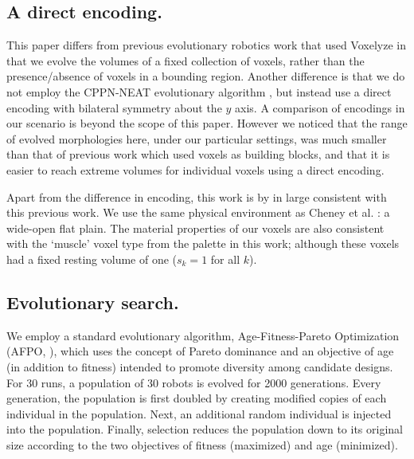 


\subsection{A direct encoding.}


This paper differs from previous evolutionary robotics work that used Voxelyze \cite{Cheney:2013:UEE:2463372.2463404, cheney2014evolved, Cheney:2015:ESR:2739480.2754662} in that we evolve the volumes of a fixed collection of voxels, rather than the presence/absence of voxels in a bounding region. 
Another difference is that 
we do not employ the CPPN-NEAT evolutionary algorithm \cite{Stanley2007}, 
but instead use a direct encoding with bilateral symmetry about the $y$ axis.
A comparison of encodings in our scenario is beyond the scope of this paper.
However we noticed that the range of evolved morphologies here, under our particular settings, was much smaller than that of previous work which used voxels as building blocks,
and that it is easier to reach extreme volumes for individual voxels using a direct encoding. 

Apart from the difference in encoding, this work is by in large consistent with this previous work. We use the same physical environment as Cheney et al. \cite{Cheney:2013:UEE:2463372.2463404}: a wide-open flat plain. The material properties of our voxels are also consistent with the `muscle' voxel type from the palette in this work;  
although these voxels had a fixed resting volume of one ($s_k=1$ for all $k$).




\subsection{Evolutionary search.}


We employ a standard evolutionary algorithm, Age-Fitness-Pareto Optimization (AFPO, \cite{Schmidt2011}), which uses the concept of Pareto dominance and an objective of age (in addition to fitness) intended to promote diversity among candidate designs. For 30 runs, a population of 30 robots is evolved for 2000 generations.
Every generation, the population is first doubled by creating modified copies of each individual in the population. Next, an additional random individual is injected into the population. Finally, selection reduces the population down to its original size according to the two objectives of fitness (maximized) and age (minimized).

